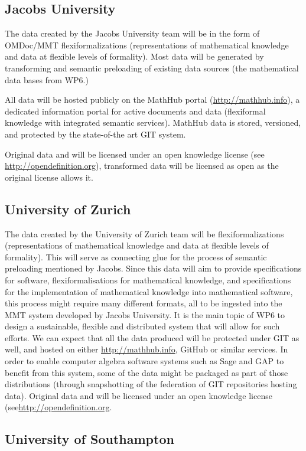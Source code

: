 \documentclass[12pt]{article}
\begin{document}
\subsection{Jacobs University}

The data created by the Jacobs University team will be in the form of OMDoc/MMT
flexiformalizations (representations of mathematical knowledge and data at flexible levels
of formality). Most data will be generated by transforming and semantic preloading of
existing data sources (the mathematical data bases from WP6.)

All data will be hosted publicly on the MathHub portal (\url{http://mathhub.info}), a
dedicated information portal for active documents and data (flexiformal knowledge with
integrated semantic services). MathHub data is stored, versioned, and protected by the
state-of-the art GIT system.

Original data and will be licensed under an open knowledge license (see
\url{http://opendefinition.org}), transformed data will be licensed as open as the
original license allows it.

\subsection{University of Zurich}
The data created by the University of Zurich team will be flexiformalizations (representations of mathematical knowledge and data at flexible levels of formality). 
This will serve as connecting glue for the process of semantic preloading mentioned by Jacobs. 
Since this data will aim to provide specifications for software, flexiformalisations for mathematical knowledge, and specifications for the implementation of mathematical knowledge into mathematical software, this process might require many different formats, all to be ingested into the MMT system developed by Jacobs University. 
It is the main topic of WP6 to design a sustainable, flexible and distributed system that will allow for such efforts. We can expect that all the data produced will be protected under GIT as well, and hosted on either \url{http://mathhub.info}, GitHub or similar services. 
In order to enable computer algebra software systems such as Sage and GAP to benefit from this system, some of the data might be packaged as part of those distributions (through snapshotting of the federation of GIT repositories hosting data).
Original data and will be licensed under an open knowledge license (see\url{http://opendefinition.org}.


\subsection{University of Southampton}
\end{document}
